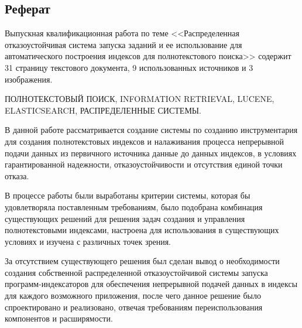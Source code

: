 \begin{center}
	\section*{Реферат}
\end{center}

Выпускная квалификационная работа по теме <<Распределенная отказоустойчивая система запуска заданий и ее использование для автоматического построения индексов для полнотекстового поиска>> содержит 31 страницу текстового документа, 9 использованных источников и 3 изображения.

ПОЛНОТЕКСТОВЫЙ ПОИСК, INFORMATION RETRIEVAL, LUCENE, ELASTICSEARCH, РАСПРЕДЕЛЕННЫЕ СИСТЕМЫ.

В данной работе рассматривается создание системы по созданию инструментария для создания полнотекстовых индексов и налаживания процесса непрерывной подачи данных из первичного источника данные до данных индексов, в условиях гарантированной надежности, отказоустойчивости и отсутствия единой точки отказа.

В процессе работы были выработаны критерии системы, которая бы удовлетворяла поставленным требованиям, было подобрана комбинация существующих решений для решения задач создания и управления полнотекстовыми индексами, настроена для использования в существующих условиях и изучена с различных точек зрения.

За отсутствием существующего решения был сделан вывод о необходимости создания собственной распределенной отказоустойчивой системы запуска программ-индексаторов для обеспечения непрерывной подачей данных в индексы для каждого возможного приложения, после чего данное решение было спроектировано и реализовано, отвечая требованиям переиспользования компонентов и расширямости.

\clearpage
